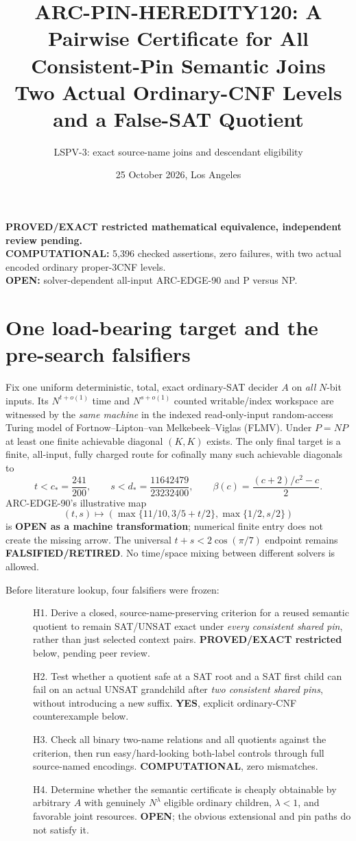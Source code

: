 \documentclass[11pt]{article}
\title{ARC-PIN-HEREDITY120: A Pairwise Certificate for All Consistent-Pin Semantic Joins\\
\large Two Actual Ordinary-CNF Levels and a False-SAT Quotient}
\author{LSPV-3: exact source-name joins and descendant eligibility}
\date{25 October 2026, Los Angeles}
\begin{document}
\maketitle
\begin{center}
\textbf{PROVED/EXACT restricted mathematical equivalence, independent review pending.}\\
\textbf{COMPUTATIONAL:} 5,396 checked assertions, zero failures, with two actual encoded ordinary proper-3CNF levels.\\
\textbf{OPEN:} solver-dependent all-input ARC-EDGE-90 and P versus NP.
\end{center}

\section{One load-bearing target and the pre-search falsifiers}
Fix one uniform deterministic, total, exact ordinary-SAT decider $A$ on
\emph{all} $N$-bit inputs. Its $N^{t+o(1)}$ time and
$N^{s+o(1)}$ counted writable/index workspace are witnessed by the
\emph{same machine} in the indexed read-only-input random-access Turing
model of Fortnow--Lipton--van Melkebeek--Viglas (FLMV). Under
$P=NP$ at least one finite achievable diagonal $(K,K)$ exists.
The only final target is a finite, all-input, fully charged route for
cofinally many such achievable diagonals to
\[
 t<c_*=\frac{241}{200},\qquad
 s<d_*=\frac{11642479}{23232400},
 \qquad
 \beta(c)=\frac{(c+2)/c^2-c}{2}.
\]
ARC-EDGE-90's illustrative map
\[
 (t,s)\mapsto
 \left(\max\{11/10,3/5+t/2\},\max\{1/2,s/2\}\right)
\]
is \textbf{OPEN as a machine transformation}; numerical finite entry
does not create the missing arrow. The universal
$t+s<2\cos(\pi/7)$ endpoint remains \textbf{FALSIFIED/RETIRED}.
No time/space mixing between different solvers is allowed.

Before literature lookup, four falsifiers were frozen:
\begin{description}
\item[] H1. Derive a closed, source-name-preserving criterion for
a reused semantic quotient to remain SAT/UNSAT exact under \emph{every
consistent shared pin}, rather than just selected context pairs.
\textbf{PROVED/EXACT restricted} below, pending peer review.
\item[] H2. Test whether a quotient safe at a SAT root and a SAT
first child can fail on an actual UNSAT grandchild after
\emph{two consistent shared pins}, without introducing a new suffix.
\textbf{YES}, explicit ordinary-CNF counterexample below.
\item[] H3. Check all binary two-name relations and all quotients
against the criterion, then run easy/hard-looking both-label controls
through full source-named encodings. \textbf{COMPUTATIONAL}, zero mismatches.
\item[] H4. Determine whether the semantic certificate is cheaply
obtainable by arbitrary $A$ with genuinely $N^\lambda$ eligible
ordinary children, $\lambda<1$, and favorable joint resources.
\textbf{OPEN}; the obvious extensional and pin paths do not satisfy it.
\end{description}
\end{document}
